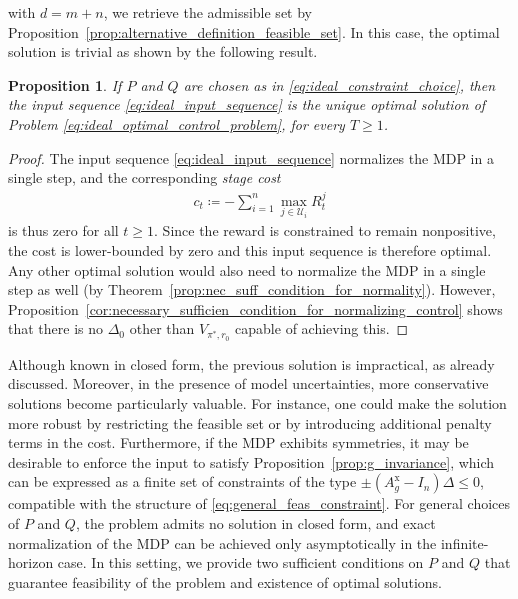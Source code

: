 \documentclass[10pt,leqno]{amsart}
\newcommand{\U}{\mathcal{U}}
\newcommand{\cost}{r}
\newcommand{\Vsym}{V}
\newcommand{\Varg}[1]{\Vsym_{#1}}
\newcommand{\Cost}{R}
\newcommand{\policy}{\pi}
\newtheorem{proposition}[theorem]{Proposition}
\begin{document}
with $d = m + n$, we retrieve the admissible set by Proposition~\ref{prop:alternative_definition_feasible_set}. In this case, the optimal solution is trivial as shown by the following result.
\begin{proposition}\label{prop:ideal_feedback_control_optimality}
    If $P$ and $Q$ are chosen as in \eqref{eq:ideal_constraint_choice}, then the input sequence \eqref{eq:ideal_input_sequence} is the unique optimal solution of Problem \eqref{eq:ideal_optimal_control_problem}, for every $T \geq 1$. 
\end{proposition}
\begin{proof}
    The input sequence \eqref{eq:ideal_input_sequence} normalizes the MDP in a single step, and the corresponding \emph{stage cost}
    \begin{align}\label{eq:stage_cost}
        c_t \coloneqq -\sum_{i = 1}^n \max_{j \in \U_i} \Cost_t^j
    \end{align}
    is thus zero for all $t \geq 1$. Since the reward is constrained to remain nonpositive, the cost is lower-bounded by zero and this input sequence is therefore optimal. Any other optimal solution would also need to normalize the MDP in a single step as well (by Theorem~\ref{prop:nec_suff_condition_for_normality}). However, Proposition~\ref{cor:necessary_sufficien_condition_for_normalizing_control} shows that there is no $\Delta_0$ other than $\Varg{\policy^*\!, \cost_0}$ capable of achieving this.
\end{proof}
\noindent Although known in closed form, the previous solution is impractical, as already discussed. Moreover, in the presence of model uncertainties, more conservative solutions become particularly valuable. For instance, one could make the solution more robust by restricting the feasible set or by introducing additional penalty terms in the cost. Furthermore, if the MDP exhibits symmetries, it may be desirable to enforce the input to satisfy Proposition~\ref{prop:g_invariance}, which can be expressed as a finite set of constraints of the type $\pm (A_g^{\mathrm{x}} - I_n) \Delta \leq 0$, compatible with the structure of \eqref{eq:general_feas_constraint}. For general choices of $P$ and $Q$, the problem admits no solution in closed form, and exact normalization of the MDP can be achieved only asymptotically in the infinite-horizon case. In this setting, we provide two sufficient conditions on $P$ and $Q$ that guarantee feasibility of the problem and existence of optimal solutions.
\end{document}
